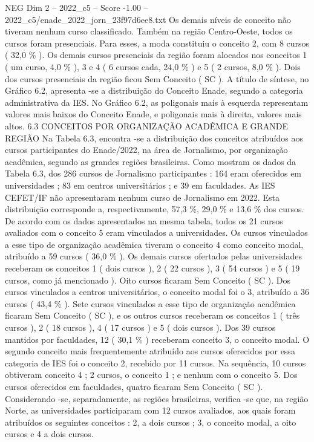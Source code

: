\begin{textsample}{NEG Dim 2 – 2022\_c5 – Score -1.00 – 2022\_c5/enade\_2022\_jorn\_23f97d6ee8.txt}
Os demais níveis de conceito não tiveram nenhum curso classificado.
Também na região Centro-Oeste, todos os cursos foram presenciais.
Para esses, a moda constituiu o conceito 2, com 8 cursos ( 32,0 \% ).
Os demais cursos presenciais da região foram alocados nos conceitos 1 ( um curso, 4,0 \% ), 3 e 4 ( 6 cursos cada, 24,0 \% ) e 5 ( 2 cursos, 8,0 \% ).
Dois dos cursos presenciais da região ficou Sem Conceito ( SC ).
A título de síntese, no Gráfico 6.2, apresenta -se a distribuição do Conceito Enade, segundo a categoria administrativa da IES.
No Gráfico 6.2, as poligonais mais à esquerda representam valores mais baixos do Conceito Enade, e poligonais mais à direita, valores mais altos. 6.3 CONCEITOS POR ORGANIZAÇÃO ACADÊMICA E GRANDE REGIÃO Na Tabela 6.3, encontra -se a distribuição dos conceitos atribuídos aos cursos participantes do Enade/2022, na área de Jornalismo, por organização acadêmica, segundo as grandes regiões brasileiras.
Como mostram os dados da Tabela 6.3, dos 286 cursos de Jornalismo participantes : 164 eram oferecidos em universidades ; 83 em centros universitários ; e 39 em faculdades.
As IES CEFET/IF não apresentaram nenhum curso de Jornalismo em 2022.
Esta distribuição corresponde a, respectivamente, 57,3 \%, 29,0 \% e 13,6 \% dos cursos.
De acordo com os dados apresentados na mesma tabela, todos os 21 cursos avaliados com o conceito 5 eram vinculados a universidades.
Os cursos vinculados a esse tipo de organização acadêmica tiveram o conceito 4 como conceito modal, atribuído a 59 cursos ( 36,0 \% ).
Os demais cursos ofertados pelas universidades receberam os conceitos 1 ( dois cursos ), 2 ( 22 cursos ), 3 ( 54 cursos ) e 5 ( 19 cursos, como já mencionado ).
Oito cursos ficaram Sem Conceito ( SC ).
Dos cursos vinculados a centros universitários, o conceito modal foi o 3, atribuído a 36 cursos ( 43,4 \% ).
Sete cursos vinculados a esse tipo de organização acadêmica ficaram Sem Conceito ( SC ), e os outros cursos receberam os conceitos 1 ( três cursos ), 2 ( 18 cursos ), 4 ( 17 cursos ) e 5 ( dois cursos ).
Dos 39 cursos mantidos por faculdades, 12 ( 30,1 \% ) receberam conceito 3, o conceito modal.
O segundo conceito mais frequentemente atribuído aos cursos oferecidos por essa categoria de IES foi o conceito 2, recebido por 11 cursos.
Na sequência, 10 cursos obtiveram conceito 4 ; 2 cursos, o conceito 1 ; e nenhum com o conceito 5.
Dos cursos oferecidos em faculdades, quatro ficaram Sem Conceito ( SC ).
Considerando -se, separadamente, as regiões brasileiras, verifica -se que, na região Norte, as universidades participaram com 12 cursos avaliados, aos quais foram atribuídos os seguintes conceitos : 2, a dois cursos ; 3, o conceito modal, a oito cursos e 4 a dois cursos.

\end{textsample}
